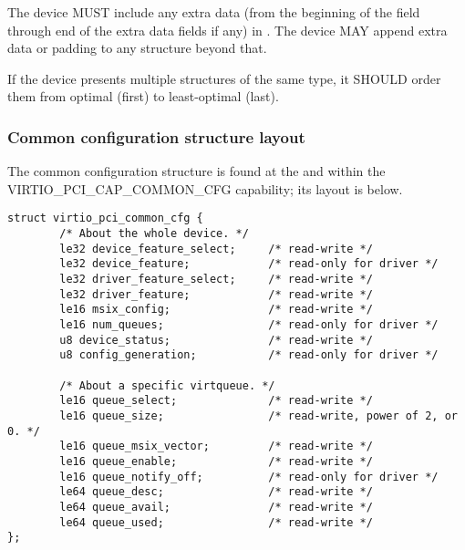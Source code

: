 
The device MUST include any extra data (from the beginning of the  field
through end of the extra data fields if any) in .
The device MAY append extra data
or padding to any structure beyond that.

If the device presents multiple structures of the same type, it SHOULD order
them from optimal (first) to least-optimal (last).

\subsubsection{Common configuration structure layout}\label{sec:Virtio Transport Options / Virtio Over PCI Bus / PCI Device Layout / Common configuration structure layout}

The common configuration structure is found at the  and  within the VIRTIO_PCI_CAP_COMMON_CFG capability; its layout is below.

\begin{lstlisting}
struct virtio_pci_common_cfg {
        /* About the whole device. */
        le32 device_feature_select;     /* read-write */
        le32 device_feature;            /* read-only for driver */
        le32 driver_feature_select;     /* read-write */
        le32 driver_feature;            /* read-write */
        le16 msix_config;               /* read-write */
        le16 num_queues;                /* read-only for driver */
        u8 device_status;               /* read-write */
        u8 config_generation;           /* read-only for driver */

        /* About a specific virtqueue. */
        le16 queue_select;              /* read-write */
        le16 queue_size;                /* read-write, power of 2, or 0. */
        le16 queue_msix_vector;         /* read-write */
        le16 queue_enable;              /* read-write */
        le16 queue_notify_off;          /* read-only for driver */
        le64 queue_desc;                /* read-write */
        le64 queue_avail;               /* read-write */
        le64 queue_used;                /* read-write */
};
\end{lstlisting}

